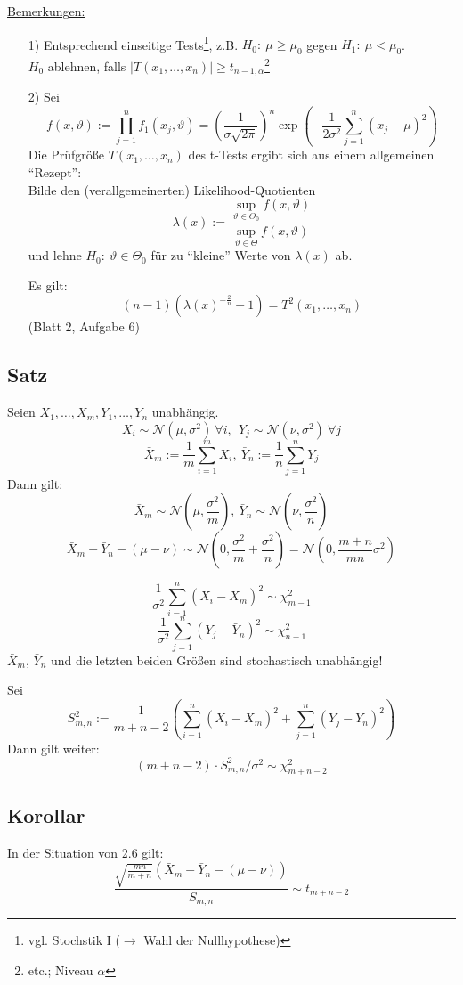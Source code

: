 \documentclass[a4paper,11pt,twoside,titlepage]{article}
\newcommand\NN{ \mathcal{N} } %
\begin{document}
\underline{Bemerkungen:}
\begin{itemize}
\item[1)] Entsprechend einseitige Tests\footnote{vgl. Stochstik I ($\rightarrow$ Wahl der Nullhypothese)}, z.B. $H_0:\ \mu\geq\mu_0$ gegen $H_1:\ \mu<\mu_0$.\\
$H_0$ ablehnen, falls $|T(x_1,\ldots,x_n)|\geq t_{n-1,\alpha}$\footnote{etc.; Niveau $\alpha$}
\item[2)] Sei
\[f(x,\vartheta):=\prod_{j=1}^n f_1(x_j,\vartheta)=\left(\frac{1}{\sigma\sqrt{2\pi}}\right)^n\exp(-\frac{1}{2\sigma^2}\sum_{j=1}^n(x_j-\mu)^2)\]
Die Prüfgröße $T(x_1,\ldots,x_n)$ des t-Tests ergibt sich aus einem allgemeinen "`Rezept"':\\
Bilde den (verallgemeinerten) Likelihood-Quotienten
\[\lambda(x):=\frac{\sup_{\vartheta\in\Theta_0}f(x,\vartheta)}{\sup_{\vartheta\in\Theta}f(x,\vartheta)}\]
und lehne $H_0:\ \vartheta\in\Theta_0$ für zu "`kleine"' Werte von $\lambda(x)$ ab.

Es gilt:
\[(n-1)(\lambda(x)^{-\frac2n}-1)=T^2(x_1,\ldots,x_n)\]
(Blatt 2, Aufgabe 6)
\end{itemize}

\subsection{Satz}
Seien $X_1,\ldots,X_m,Y_1,\ldots,Y_n$ unabhängig.
\[X_i\sim\NN(\mu,\sigma^2)\ \forall i,\ \ Y_j\sim\NN(\nu,\sigma^2)\ \forall j\]
\[\bar{X}_m:=\frac 1m\sum_{i=1}^mX_i,\ \bar Y_n:=\frac1n\sum_{j=1}^nY_j\]
Dann gilt:
\[\bar{X}_m \sim\NN(\mu,\frac{\sigma^2}{m}),\ \bar{Y}_n \sim\NN(\nu,\frac{\sigma^2}{n})\]
\[\bar X_m-\bar Y_n-(\mu-\nu)\sim\NN(0,\frac{\sigma^2}{m}+\frac{\sigma^2}{n})=\NN(0,\frac{m+n}{mn}\sigma^2)\]

\[\frac{1}{\sigma^2} \sum_{i=1}^n(X_i-\bar{X}_m)^2\sim\chi_{m-1}^2\]
\[\frac{1}{\sigma^2}\sum_{j=1}^n(Y_j-\bar{Y}_n)^2\sim\chi_{n-1}^2\]
$\bar X_m$, $\bar Y_n$ und die letzten beiden Größen sind stochastisch unabhängig!

Sei
\[S_{m,n}^2:=\frac{1}{m+n-2}(\sum_{i=1}^n(X_i-\bar{X}_m)^2+\sum_{j=1}^n(Y_j-\bar{Y}_n)^2)\]
Dann gilt weiter:
\[(m+n-2)\cdot S_{m,n}^2/\sigma^2\sim\chi^2_{m+n-2}\]

\subsection{Korollar}
In der Situation von 2.6 gilt: 
\[\frac{\sqrt{\frac{mn}{m+n}}(\bar X_m-\bar Y_n-(\mu-\nu))}{S_{m,n}}\sim t_{m+n-2}\]
\end{document}
